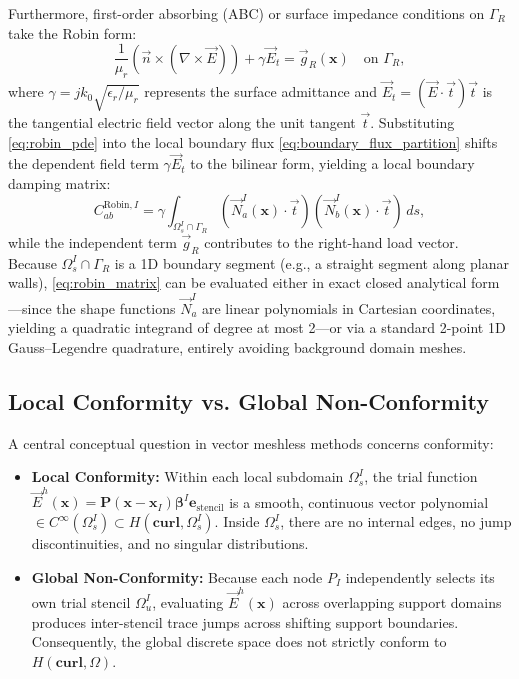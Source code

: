 \documentclass[VANCOUVER,Times1COL]{WileyNJD-v5}
\begin{document}
Furthermore, first-order absorbing (ABC) or surface impedance conditions on $\Gamma_R$ take the Robin form:
\begin{equation}
    \frac{1}{\mu_r} \left( \vec{n} \times (\nabla \times \vec{E}) \right) + \gamma \vec{E}_t = \vec{g}_R(\mathbf{x}) \quad \text{on } \Gamma_R,
    \label{eq:robin_pde}
\end{equation}
where $\gamma = j k_0 \sqrt{\epsilon_r / \mu_r}$ represents the surface admittance and $\vec{E}_t = (\vec{E} \cdot \vec{t})\vec{t}$ is the tangential electric field vector along the unit tangent $\vec{t}$. Substituting \eqref{eq:robin_pde} into the local boundary flux \eqref{eq:boundary_flux_partition} shifts the dependent field term $\gamma \vec{E}_t$ to the bilinear form, yielding a local boundary damping matrix:
\begin{equation}
    C_{ab}^{\mathrm{Robin}, I} = \gamma \int_{\Omega_s^I \cap \Gamma_R} \left( \vec{N}_a^I(\mathbf{x}) \cdot \vec{t} \right) \left( \vec{N}_b^I(\mathbf{x}) \cdot \vec{t} \right) \, ds,
    \label{eq:robin_matrix}
\end{equation}
while the independent term $\vec{g}_R$ contributes to the right-hand load vector. Because $\Omega_s^I \cap \Gamma_R$ is a 1D boundary segment (e.g., a straight segment along planar walls), \eqref{eq:robin_matrix} can be evaluated either in exact closed analytical form---since the shape functions $\vec{N}_a^I$ are linear polynomials in Cartesian coordinates, yielding a quadratic integrand of degree at most 2---or via a standard 2-point 1D Gauss--Legendre quadrature, entirely avoiding background domain meshes.

\subsection{Local Conformity vs. Global Non-Conformity}
\label{subsec:conformity_discussion}

A central conceptual question in vector meshless methods concerns conformity:
\begin{itemize}
    \item \textbf{Local Conformity:} Within each local subdomain $\Omega_s^I$, the trial function $\vec{E}^h(\mathbf{x}) = \mathbf{P}(\mathbf{x} - \mathbf{x}_I) \boldsymbol{\beta}^I \mathbf{e}_{\mathrm{stencil}}$ is a smooth, continuous vector polynomial $\in C^\infty(\Omega_s^I) \subset H(\mathbf{curl}, \Omega_s^I)$. Inside $\Omega_s^I$, there are no internal edges, no jump discontinuities, and no singular distributions.
    \item \textbf{Global Non-Conformity:} Because each node $P_I$ independently selects its own trial stencil $\Omega_u^I$, evaluating $\vec{E}^h(\mathbf{x})$ across overlapping support domains produces inter-stencil trace jumps across shifting support boundaries. Consequently, the global discrete space does not strictly conform to $H(\mathbf{curl}, \Omega)$.
\end{itemize}
\end{document}
